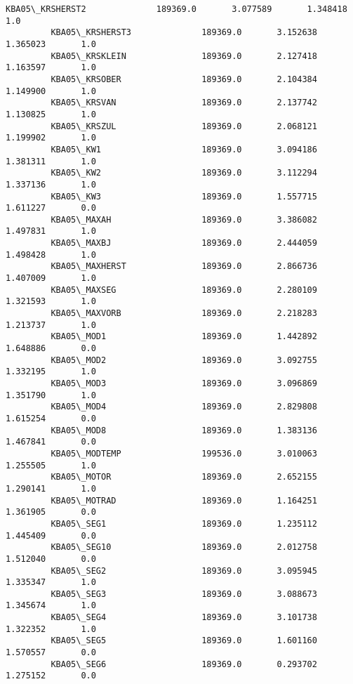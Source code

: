 \documentclass[11pt]{article}
\begin{document}
\begin{Verbatim}[commandchars=\\\{\}]
         KBA05\_KRSHERST2              189369.0       3.077589       1.348418       1.0   
         KBA05\_KRSHERST3              189369.0       3.152638       1.365023       1.0   
         KBA05\_KRSKLEIN               189369.0       2.127418       1.163597       1.0   
         KBA05\_KRSOBER                189369.0       2.104384       1.149900       1.0   
         KBA05\_KRSVAN                 189369.0       2.137742       1.130825       1.0   
         KBA05\_KRSZUL                 189369.0       2.068121       1.199902       1.0   
         KBA05\_KW1                    189369.0       3.094186       1.381311       1.0   
         KBA05\_KW2                    189369.0       3.112294       1.337136       1.0   
         KBA05\_KW3                    189369.0       1.557715       1.611227       0.0   
         KBA05\_MAXAH                  189369.0       3.386082       1.497831       1.0   
         KBA05\_MAXBJ                  189369.0       2.444059       1.498428       1.0   
         KBA05\_MAXHERST               189369.0       2.866736       1.407009       1.0   
         KBA05\_MAXSEG                 189369.0       2.280109       1.321593       1.0   
         KBA05\_MAXVORB                189369.0       2.218283       1.213737       1.0   
         KBA05\_MOD1                   189369.0       1.442892       1.648886       0.0   
         KBA05\_MOD2                   189369.0       3.092755       1.332195       1.0   
         KBA05\_MOD3                   189369.0       3.096869       1.351790       1.0   
         KBA05\_MOD4                   189369.0       2.829808       1.615254       0.0   
         KBA05\_MOD8                   189369.0       1.383136       1.467841       0.0   
         KBA05\_MODTEMP                199536.0       3.010063       1.255505       1.0   
         KBA05\_MOTOR                  189369.0       2.652155       1.290141       1.0   
         KBA05\_MOTRAD                 189369.0       1.164251       1.361905       0.0   
         KBA05\_SEG1                   189369.0       1.235112       1.445409       0.0   
         KBA05\_SEG10                  189369.0       2.012758       1.512040       0.0   
         KBA05\_SEG2                   189369.0       3.095945       1.335347       1.0   
         KBA05\_SEG3                   189369.0       3.088673       1.345674       1.0   
         KBA05\_SEG4                   189369.0       3.101738       1.322352       1.0   
         KBA05\_SEG5                   189369.0       1.601160       1.570557       0.0   
         KBA05\_SEG6                   189369.0       0.293702       1.275152       0.0   

\end{Verbatim}
\end{document}
